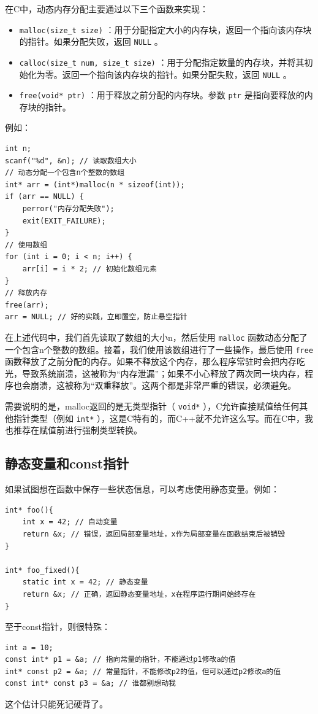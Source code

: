 在C中，动态内存分配主要通过以下三个函数来实现：
\begin{itemize}
  \item \texttt{malloc(size\_t size)} ：用于分配指定大小的内存块，返回一个指向该内存块的指针。如果分配失败，返回 \texttt{NULL} 。
  \item \texttt{calloc(size\_t num, size\_t size)} ：用于分配指定数量的内存块，并将其初始化为零。返回一个指向该内存块的指针。如果分配失败，返回 \texttt{NULL} 。
  \item \texttt{free(void* ptr)} ：用于释放之前分配的内存块。参数 \texttt{ptr} 是指向要释放的内存块的指针。
\end{itemize}
例如：
\begin{verbatim}
int n;
scanf("%d", &n); // 读取数组大小
// 动态分配一个包含n个整数的数组
int* arr = (int*)malloc(n * sizeof(int));
if (arr == NULL) {
    perror("内存分配失败");
    exit(EXIT_FAILURE);
}
// 使用数组
for (int i = 0; i < n; i++) {
    arr[i] = i * 2; // 初始化数组元素
}
// 释放内存
free(arr);
arr = NULL; // 好的实践，立即置空，防止悬空指针
\end{verbatim}
在上述代码中，我们首先读取了数组的大小n，然后使用 \texttt{malloc} 函数动态分配了一个包含n个整数的数组。接着，我们使用该数组进行了一些操作，最后使用 \texttt{free} 函数释放了之前分配的内存。如果不释放这个内存，那么程序常驻时会把内存吃光，导致系统崩溃，这被称为“内存泄漏”；如果不小心释放了两次同一块内存，程序也会崩溃，这被称为“双重释放”。这两个都是非常严重的错误，必须避免。

需要说明的是，malloc返回的是无类型指针（ \texttt{void*} ），C允许直接赋值给任何其他指针类型（例如 \texttt{int*} ），这是C特有的，而C++就不允许这么写。而在C中，我也推荐在赋值前进行强制类型转换。

\subsection{静态变量和const指针}

如果试图想在函数中保存一些状态信息，可以考虑使用静态变量。例如：
\begin{verbatim}
int* foo(){
    int x = 42; // 自动变量
    return &x; // 错误，返回局部变量地址，x作为局部变量在函数结束后被销毁
}

int* foo_fixed(){
    static int x = 42; // 静态变量
    return &x; // 正确，返回静态变量地址，x在程序运行期间始终存在
}
\end{verbatim}

至于const指针，则很特殊：
\begin{verbatim}
int a = 10;
const int* p1 = &a; // 指向常量的指针，不能通过p1修改a的值
int* const p2 = &a; // 常量指针，不能修改p2的值，但可以通过p2修改a的值
const int* const p3 = &a; // 谁都别想动我
\end{verbatim}
这个估计只能死记硬背了。

